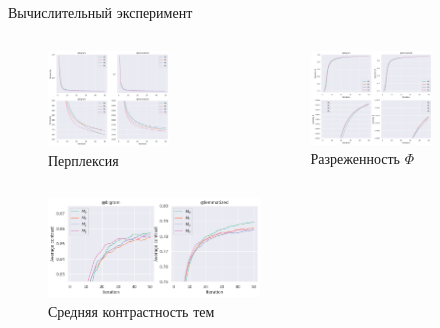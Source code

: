 \documentclass{beamer}
\begin{document}
\begin{frame}{Вычислительный эксперимент}

\begin{columns}[c]
\begin{figure}
\includegraphics[width=0.75\textwidth]{perplexity_v3}
\caption{Перплексия}
\end{figure}

\begin{figure}
\includegraphics[width=0.75\textwidth]{sparsity_v3}
\caption{Разреженность $\Phi$}
\end{figure}
\end{columns}

\begin{figure}
\includegraphics[width=0.5\textwidth]{avg_contrast_v3}
\caption{Средняя контрастность тем}
\end{figure}

\end{frame}
\end{document}

